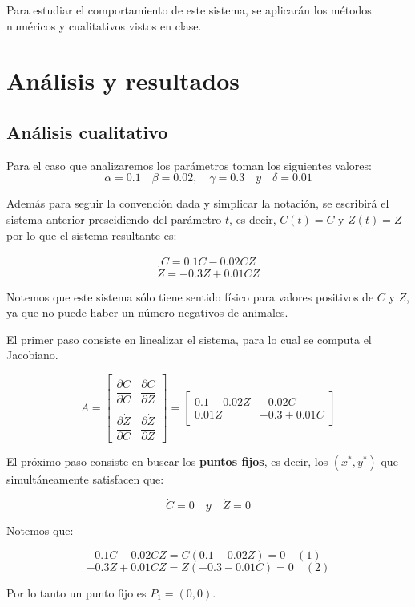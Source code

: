 \documentclass[12pt,letterpaper]{article}
\begin{document}
Para estudiar el comportamiento de este sistema, se aplicarán los métodos numéricos y cualitativos vistos en clase.

\section{Análisis y resultados}

\subsection{Análisis cualitativo}

Para el caso que analizaremos los parámetros toman los siguientes valores:
$$ \alpha= 0.1 \quad \beta = 0.02, \quad \gamma = 0.3 \quad y \quad  \delta = 0.01$$

Además para seguir la convención dada y simplicar la notación, se escribirá el sistema anterior prescidiendo del parámetro $t$, es decir, $C(t) = C$ y $Z(t) = Z$ por lo que el sistema resultante es:

$$\dot{C} =  0.1 C - 0.02 CZ $$
$$\dot{Z} = -0.3 Z + 0.01 CZ $$

Notemos que este sistema sólo tiene sentido físico para valores positivos de $C$ y $Z$, ya que no puede haber un número negativos de animales. 

El primer paso consiste en linealizar el sistema, para lo cual se computa el Jacobiano.

$$A = 
\begin{bmatrix}
\dfrac{\partial \dot{C}}{\partial C} & \dfrac{\partial \dot{C}}{\partial Z} \\
 & \\
\dfrac{\partial \dot{Z}}{\partial C} & \dfrac{\partial \dot{Z}}{\partial Z} 
\end{bmatrix} 
= 
\begin{bmatrix}
0.1 - 0.02 Z & -0.02 C \\
0.01 Z & -0.3 + 0.01 C  
\end{bmatrix}
$$

El próximo paso consiste en buscar los \textbf{puntos fijos},  es decir, los $(x^*, y^*)$ que simultáneamente satisfacen que:

$$\dot{C} = 0 \quad y \quad \dot{Z} = 0 $$

Notemos que:

$$0.1 C - 0.02 CZ = C(0.1 - 0.02 Z) = 0 \quad (1)$$
$$−0.3 Z + 0.01 CZ = Z(-0.3 - 0.01 C) = 0 \quad (2)$$

Por lo tanto un punto fijo es $P_1 = (0, 0)$. 
\end{document}

